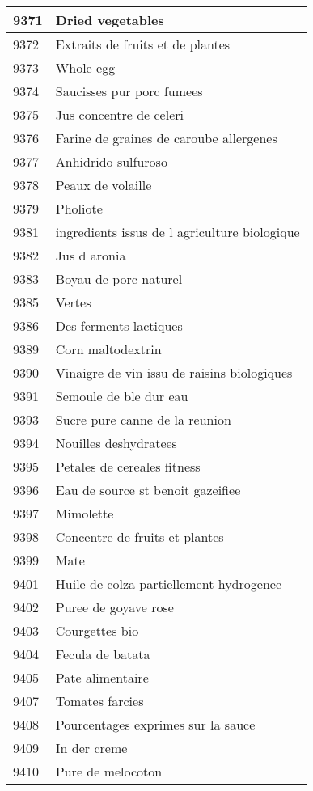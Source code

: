 \begin{longtable}{|l|l|}
9371 & Dried vegetables \\ \hline 
9372 & Extraits de fruits et de plantes \\ \hline 
9373 & Whole egg \\ \hline 
9374 & Saucisses pur porc fumees \\ \hline 
9375 & Jus concentre de celeri \\ \hline 
9376 & Farine de graines de caroube allergenes \\ \hline 
9377 & Anhidrido sulfuroso \\ \hline 
9378 & Peaux de volaille \\ \hline 
9379 & Pholiote \\ \hline 
9381 &  ingredients issus de l agriculture biologique \\ \hline 
9382 & Jus d aronia \\ \hline 
9383 & Boyau de porc naturel \\ \hline 
9385 & Vertes \\ \hline 
9386 & Des ferments lactiques \\ \hline 
9389 & Corn maltodextrin \\ \hline 
9390 & Vinaigre de vin issu de raisins biologiques \\ \hline 
9391 & Semoule de ble dur eau \\ \hline 
9393 & Sucre pure canne de la reunion \\ \hline 
9394 & Nouilles deshydratees \\ \hline 
9395 & Petales de cereales fitness \\ \hline 
9396 & Eau de source st benoit gazeifiee \\ \hline 
9397 & Mimolette \\ \hline 
9398 & Concentre de fruits et plantes \\ \hline 
9399 & Mate \\ \hline 
9401 & Huile de colza partiellement hydrogenee \\ \hline 
9402 & Puree de goyave rose \\ \hline 
9403 & Courgettes bio \\ \hline 
9404 & Fecula de batata \\ \hline 
9405 & Pate alimentaire \\ \hline 
9407 & Tomates farcies \\ \hline 
9408 & Pourcentages exprimes sur la sauce \\ \hline 
9409 & In der creme \\ \hline 
9410 & Pure de melocoton \\ \hline 

\end{longtable}
